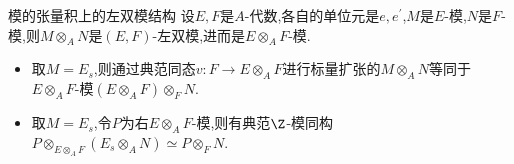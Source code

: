 \begin{example}{模的张量积上的左双模结构}{}
	设$E,F$是$A$-代数,各自的单位元是$e,e^{\prime}$,$M$是$E$-模,$N$是$F$-模,则$M\otimes_{A}N$是$\left(E,F\right)$-左双模,进而是$E\otimes_{A}F$-模.
	\begin{itemize}
		\item 取$M=E_{s}$,则通过典范同态$v:F\to E\otimes_{A}F$进行标量扩张的$M\otimes_{A}N$等同于$E\otimes_{A}F$-模$\left(E\otimes_{A}F\right)\otimes_{F}N$.
		\item 取$M=E_{s}$,令$P$为右$E\otimes_{A}F$-模,则有典范$\Z$-模同构$P\otimes_{E\otimes_{A}F}\left(E_{s}\otimes_{A}N\right)\simeq P\otimes_{F}N$.
	\end{itemize}
\end{example}























